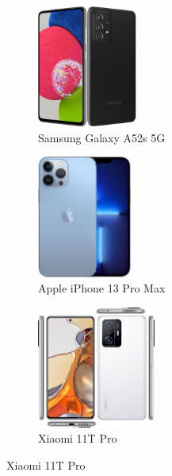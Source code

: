 \documentclass[10pt, UKenglish]{exam}
\begin{document}
\begin{figure}[htpb]
	\captionsetup[subfigure]{justification=centering}
	\centering
	\begin{subfigure}[htpb]{0.25\linewidth}
	\begin{center}
		\includegraphics[width=\linewidth,height=4cm,keepaspectratio]{samsung-galaxy-a52s-5g}
	\end{center}
	\caption{Samsung Galaxy A52s 5G}
	\label{fig:samsung-galaxy-a52s-5g}
	\end{subfigure}
	\begin{subfigure}[htpb]{0.25\linewidth}
	\begin{center}
		\includegraphics[width=\linewidth,height=4cm,keepaspectratio]{apple-iphone-13-pro-max}
	\end{center}
	\caption{Apple iPhone 13 Pro Max}
	\label{fig:apple-iphone-13-pro-max}
	\end{subfigure}
	\begin{subfigure}[htpb]{0.25\linewidth}
	\begin{center}
		\includegraphics[width=\linewidth,height=4cm,keepaspectratio]{xiaomi-11t-pro}
	\end{center}
	\caption{Xiaomi 11T Pro}
	\label{fig:xiaomi-11t-pro}
	\end{subfigure}


\end{figure}
\end{document}

